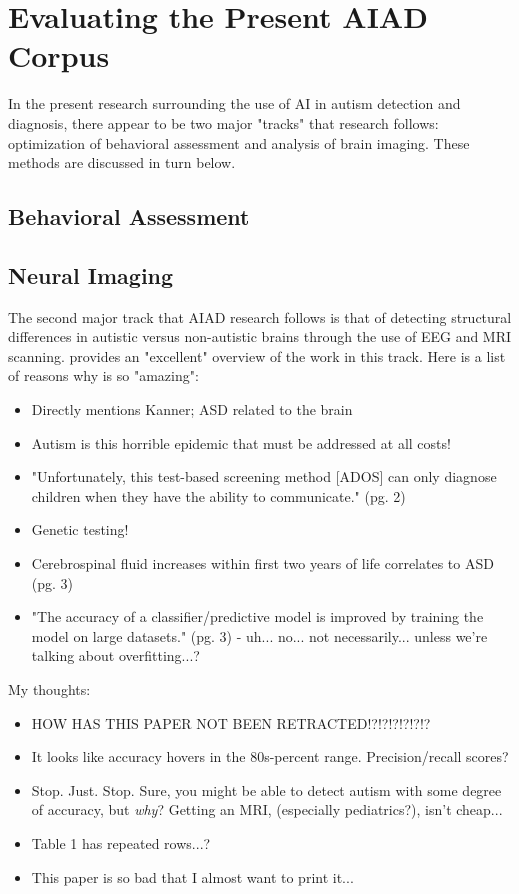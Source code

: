 \documentclass[letterpaper]{article}
\begin{document}
\section{Evaluating the Present AIAD Corpus}
In the present research surrounding the use of AI in autism detection and diagnosis, there appear to be two major "tracks" that research follows: optimization of behavioral assessment and analysis of brain imaging. These methods are discussed in turn below.

\subsection{Behavioral Assessment}

\subsection{Neural Imaging}
The second major track that AIAD research follows is that of detecting structural differences in autistic versus non-autistic brains through the use of EEG and MRI scanning. \cite{mri} provides an "excellent" overview of the work in this track. Here is a list of reasons why \cite{mri} is so "amazing":
\begin{itemize}
    \item Directly mentions Kanner; ASD related to the brain
    \item Autism is this horrible epidemic that must be addressed at all costs!
    \item "Unfortunately, this test-based screening method [ADOS] can only diagnose children when they have the ability to communicate." (pg. 2)
    \item Genetic testing!
    \item Cerebrospinal fluid increases within first two years of life correlates to ASD (pg. 3)
    \item "The accuracy of a classifier/predictive model is improved by training the model on large datasets." (pg. 3) - uh... no... not necessarily... unless we're talking about overfitting...?
\end{itemize}

My thoughts:
\begin{itemize}
    \item HOW HAS THIS PAPER NOT BEEN RETRACTED!?!?!?!?!?!?
    \item It looks like accuracy hovers in the 80s-percent range. Precision/recall scores?
    \item Stop. Just. Stop. Sure, you might be able to detect autism with some degree of accuracy, but \textit{why}? Getting an MRI, (especially pediatrics?), isn't cheap...
    \item Table 1 has repeated rows...?
    \item This paper is so bad that I almost want to print it...
\end{itemize}
\end{document}
